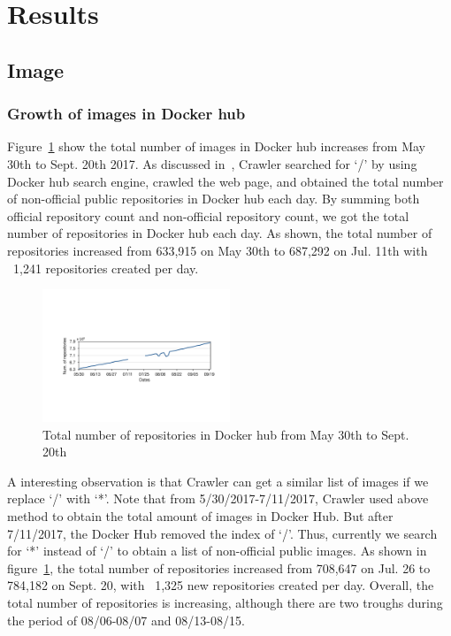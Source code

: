 \section{Results}
\label{sec:results}

\subsection{Image}

\subsubsection{Growth of images in Docker hub}

Figure~\ref{fig_image_growth} show the total number of images in Docker hub increases from May 30th to Sept. 20th 2017. As discussed in~\cite{XXX}, Crawler searched for `/' by using Docker hub search engine, crawled the web page, and obtained the total number of non-official public repositories in Docker hub each day. By summing both official repository count and non-official repository count, we got the total number of repositories in Docker hub each day. As shown, the total number of repositories increased from 633,915 on May 30th to 687,292 on Jul. 11th with ~1,241 repositories created per day.

\begin{figure}
  \centering
  \includegraphics[width=0.5\textwidth]{graphs/image_growth.pdf}
  \caption{Total number of repositories in Docker hub from May 30th to Sept. 20th}\label{fig_image_growth}
\end{figure}

A interesting observation is that Crawler can get a similar list of images if we replace `/' with `*'. Note that from 5/30/2017-7/11/2017, Crawler used above method to obtain the total amount of images in Docker Hub. But after 7/11/2017, the Docker Hub removed the index of `/'. Thus, currently we search for `*' instead of `/' to obtain a list of non-official public images. As shown in figure~\ref{fig_image_growth}, the total number of repositories increased from 708,647 on Jul. 26 to 784,182 on Sept. 20, with ~1,325 new repositories created per day. Overall, the total number of repositories is increasing, although there are two troughs during the period of 08/06-08/07 and 08/13-08/15.

